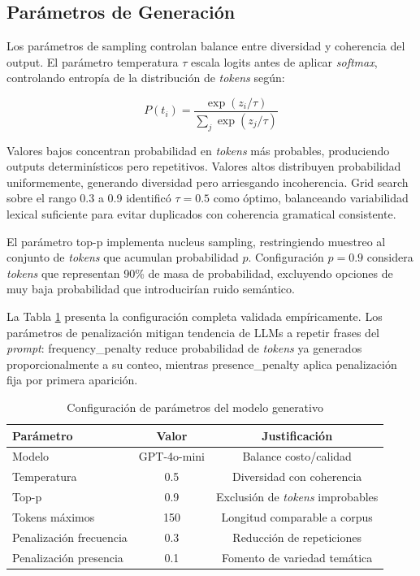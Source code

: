 \subsection{Parámetros de Generación}
\label{subsec:parametros_generacion}

Los parámetros de sampling controlan balance entre diversidad y coherencia del output. El parámetro temperatura $\tau$ escala logits antes de aplicar \textit{softmax}, controlando entropía de la distribución de \textit{tokens} según:

\begin{equation}
P(t_i) = \frac{\exp(z_i / \tau)}{\sum_j \exp(z_j / \tau)}
\end{equation}

Valores bajos concentran probabilidad en \textit{tokens} más probables, produciendo outputs determinísticos pero repetitivos. Valores altos distribuyen probabilidad uniformemente, generando diversidad pero arriesgando incoherencia. Grid search sobre el rango 0.3 a 0.9 identificó $\tau = 0.5$ como óptimo, balanceando variabilidad lexical suficiente para evitar duplicados con coherencia gramatical consistente.

El parámetro top-p implementa nucleus sampling, restringiendo muestreo al conjunto de \textit{tokens} que acumulan probabilidad $p$. Configuración $p = 0.9$ considera \textit{tokens} que representan 90\% de masa de probabilidad, excluyendo opciones de muy baja probabilidad que introducirían ruido semántico.

La Tabla \ref{tab:llm_config} presenta la configuración completa validada empíricamente. Los parámetros de penalización mitigan tendencia de LLMs a repetir frases del \textit{prompt}: frequency\_penalty reduce probabilidad de \textit{tokens} ya generados proporcionalmente a su conteo, mientras presence\_penalty aplica penalización fija por primera aparición.

\begin{table}[h]
\centering
\caption{Configuración de parámetros del modelo generativo}
\label{tab:llm_config}
\begin{tabular}{lcc}
\hline
Parámetro & Valor & Justificación \\
\hline
Modelo & GPT-4o-mini & Balance costo/calidad \\
Temperatura & 0.5 & Diversidad con coherencia \\
Top-p & 0.9 & Exclusión de \textit{tokens} improbables \\
Tokens máximos & 150 & Longitud comparable a corpus \\
Penalización frecuencia & 0.3 & Reducción de repeticiones \\
Penalización presencia & 0.1 & Fomento de variedad temática \\
\hline
\end{tabular}
\end{table}

